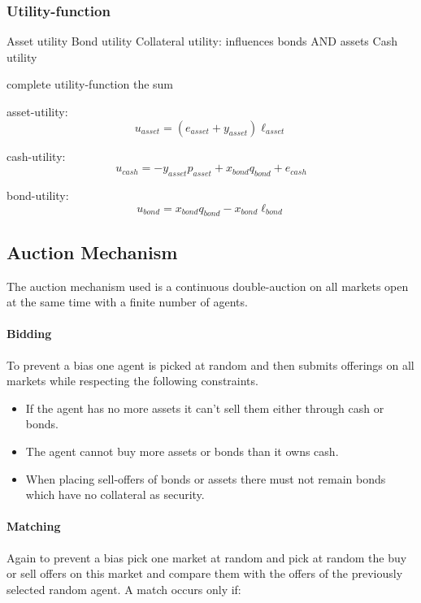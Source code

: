 \documentclass[../Bachelorarbeit.tex]{subfiles}
\begin{document}
\subsubsection{Utility-function}
Asset utility
Bond utility
Collateral utility: influences bonds AND assets
Cash utility

complete utility-function the sum

asset-utility:
\begin{equation}
u_{asset} = (e_{asset} + y_{asset}) \ell_{asset}
\end{equation}

cash-utility:
\begin{equation}
u_{cash} = -y_{asset} p_{asset} + x_{bond} q_{bond} + e_{cash}
\end{equation}

bond-utility:
\begin{equation}
u_{bond} = x_{bond} q_{bond} - x_{bond} \ell_{bond}
\end{equation}

\subsection{Auction Mechanism}
The auction mechanism used is a continuous double-auction on all markets open at the same time with a finite number of agents.

\paragraph{Bidding}
To prevent a bias one agent is picked at random and then submits offerings on all markets while respecting the following constraints.

\begin{itemize}
\item If the agent has no more assets it can't sell them either through cash or bonds.
\item The agent cannot buy more assets or bonds than it owns cash.
\item When placing sell-offers of bonds or assets there must not remain bonds which have no collateral as security. 
\end{itemize}

\paragraph{Matching}
Again to prevent a bias pick one market at random and pick at random the buy or sell offers on this market and compare them with the offers of the previously selected random agent. A match occurs only if:
\end{document}

